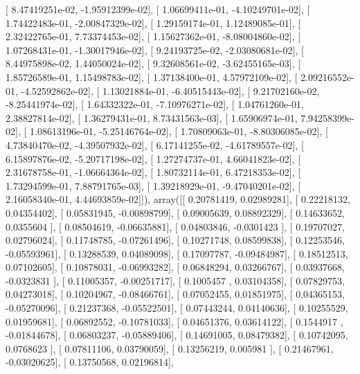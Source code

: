 \documentclass{article}
\begin{document}
       [  8.47419251e-02,  -1.95912399e-02],
       [  1.06699411e-01,  -4.10249701e-02],
       [  1.74422483e-01,  -2.00847329e-02],
       [  1.29159174e-01,   1.12489085e-01],
       [  2.32422765e-01,   7.73374453e-02],
       [  1.15627362e-01,  -8.08004860e-02],
       [  1.07268431e-01,  -1.30017946e-02],
       [  9.24193725e-02,  -2.03080681e-02],
       [  8.44975898e-02,   1.44050024e-02],
       [  9.32608561e-02,  -3.62455165e-03],
       [  1.85726589e-01,   1.15498783e-02],
       [  1.37138400e-01,   4.57972109e-02],
       [  2.09216552e-01,  -4.52592862e-02],
       [  1.13021884e-01,  -6.40515443e-02],
       [  9.21702160e-02,  -8.25441974e-02],
       [  1.64332322e-01,  -7.10976271e-02],
       [  1.04761260e-01,   2.38827814e-02],
       [  1.36279431e-01,   8.73431563e-03],
       [  1.65906974e-01,   7.94258399e-02],
       [  1.08613196e-01,  -5.25146764e-02],
       [  1.70809063e-01,  -8.80306085e-02],
       [  4.73840470e-02,  -4.39507932e-02],
       [  6.17141255e-02,  -4.61789557e-02],
       [  6.15897876e-02,  -5.20717198e-02],
       [  1.27274737e-01,   4.66041823e-02],
       [  2.31678758e-01,  -1.06664364e-02],
       [  1.80732114e-01,   6.47218353e-02],
       [  1.73294599e-01,   7.88791765e-03],
       [  1.39218929e-01,  -9.47040201e-02],
       [  2.16058340e-01,   4.44693859e-02]]), array([[ 0.20781419,  0.02989281],
       [ 0.22218132,  0.04354402],
       [ 0.05831945, -0.00898799],
       [ 0.09005639,  0.08892329],
       [ 0.14633652,  0.0355604 ],
       [ 0.08504619, -0.06635881],
       [ 0.04803846, -0.0301423 ],
       [ 0.19707027,  0.02796024],
       [ 0.11748785, -0.07261496],
       [ 0.10271748,  0.08599838],
       [ 0.12253546, -0.05593961],
       [ 0.13288539,  0.04089098],
       [ 0.17097787, -0.09484987],
       [ 0.18512513,  0.07102605],
       [ 0.10878031, -0.06993282],
       [ 0.06848294,  0.03266767],
       [ 0.03937668, -0.0323831 ],
       [ 0.11005357, -0.00251717],
       [ 0.1005457 ,  0.03104358],
       [ 0.07829753,  0.04273018],
       [ 0.10204967, -0.08466761],
       [ 0.07052455,  0.01851975],
       [ 0.04365153, -0.05270096],
       [ 0.21237368, -0.05522501],
       [ 0.07443244,  0.04140636],
       [ 0.10255529,  0.01959681],
       [ 0.06892552, -0.10781033],
       [ 0.04651376,  0.03614122],
       [ 0.1544917 , -0.01844678],
       [ 0.06803237, -0.05889406],
       [ 0.14691005,  0.08479382],
       [ 0.10742095,  0.0768623 ],
       [ 0.07811106,  0.03790059],
       [ 0.13256219,  0.005981  ],
       [ 0.21467961, -0.03020625],
       [ 0.13750568,  0.02196814],
\end{document}
